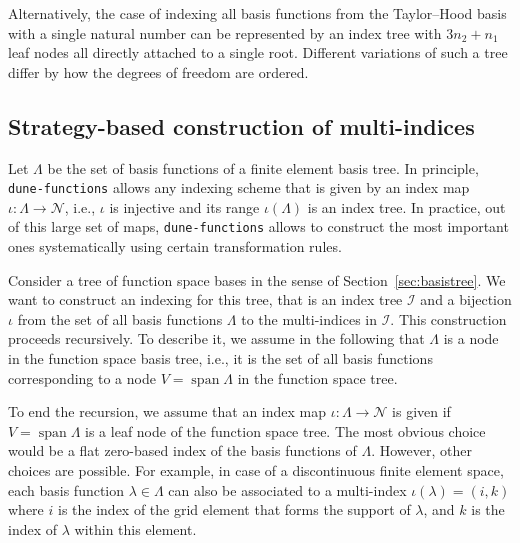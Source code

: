 \documentclass[a4paper,10pt,headings=normal,bibliography=totoc]{scrartcl}
\newcommand{\dunemodule}[1]{\texttt{#1}}
\begin{document}
Alternatively, the case of indexing all basis functions from the Taylor--Hood basis with a single
natural number can be represented by an index tree with $3 n_2 + n_1$ leaf nodes all
directly attached to a single root. Different variations of such a tree differ by how the
degrees of freedom are ordered.




\subsection{Strategy-based construction of multi-indices}
\label{sec:index_strategies}

Let $\Lambda$ be the set of basis functions of a finite element basis tree.
In principle, \dunemodule{dune-functions} allows any indexing scheme that
is given by an index map $\iota: \Lambda \to \mathcal{N}$,
i.e., $\iota$ is injective and its range $\iota(\Lambda)$ is an index tree.  In practice,
out of this large set of maps, \dunemodule{dune-functions} allows to construct the most
important ones systematically using certain transformation rules.

Consider a tree of function space bases in the sense of Section~\ref{sec:basistree}.
We want to construct an indexing for this tree, that is
an index tree $\mathcal{I}$ and a bijection $\iota$ from the set of all basis functions $\Lambda$
to the multi-indices in $\mathcal{I}$. This construction proceeds recursively.
To describe it,
we assume in the following that $\Lambda$ is a node in the function space
basis tree, i.e., it is the set of all basis functions
corresponding to a node $V=\operatorname{span} \Lambda$
in the function space tree.

To end the recursion, we assume that an index map $\iota : \Lambda \to \mathcal{N}$
is given if $V = \operatorname{span} \Lambda$ is a leaf node of the function space tree.
The most obvious choice would be a flat zero-based index
of the basis functions of $\Lambda$. However, other choices are possible.
For example, in case of a discontinuous finite element space, each
basis function $\lambda \in \Lambda$ can also be associated to a multi-index $\iota(\lambda)=(i,k)$ where $i$ is the
index of the grid element that forms the support of $\lambda$, and $k$ is the index of $\lambda$
within this element.
\end{document}
